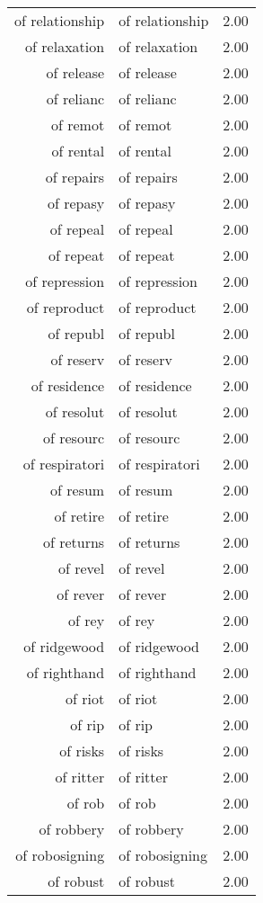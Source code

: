 \begin{table}[ht]
\begin{tabular}{rlr}
  of relationship & of relationship & 2.00 \\ 
  of relaxation & of relaxation & 2.00 \\ 
  of release & of release & 2.00 \\ 
  of relianc & of relianc & 2.00 \\ 
  of remot & of remot & 2.00 \\ 
  of rental & of rental & 2.00 \\ 
  of repairs & of repairs & 2.00 \\ 
  of repasy & of repasy & 2.00 \\ 
  of repeal & of repeal & 2.00 \\ 
  of repeat & of repeat & 2.00 \\ 
  of repression & of repression & 2.00 \\ 
  of reproduct & of reproduct & 2.00 \\ 
  of republ & of republ & 2.00 \\ 
  of reserv & of reserv & 2.00 \\ 
  of residence & of residence & 2.00 \\ 
  of resolut & of resolut & 2.00 \\ 
  of resourc & of resourc & 2.00 \\ 
  of respiratori & of respiratori & 2.00 \\ 
  of resum & of resum & 2.00 \\ 
  of retire & of retire & 2.00 \\ 
  of returns & of returns & 2.00 \\ 
  of revel & of revel & 2.00 \\ 
  of rever & of rever & 2.00 \\ 
  of rey & of rey & 2.00 \\ 
  of ridgewood & of ridgewood & 2.00 \\ 
  of righthand & of righthand & 2.00 \\ 
  of riot & of riot & 2.00 \\ 
  of rip & of rip & 2.00 \\ 
  of risks & of risks & 2.00 \\ 
  of ritter & of ritter & 2.00 \\ 
  of rob & of rob & 2.00 \\ 
  of robbery & of robbery & 2.00 \\ 
  of robosigning & of robosigning & 2.00 \\ 
  of robust & of robust & 2.00 \\ 

\end{tabular}
\end{table}
